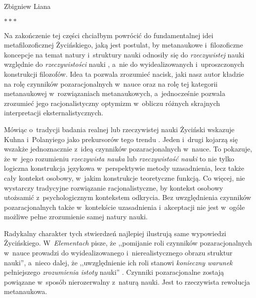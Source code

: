 \begin{artplenv}{Zbigniew Liana}
\pagebreak %
\medskip
{\centering$\ast\ast\ast$\par}
\smallskip


Na zakończenie tej części chciałbym powrócić do fundamentalnej idei metafilozoficznej Życińskiego, jaką jest postulat,
by metanaukowe i~filozoficzne koncepcje na temat natury i~struktury nauki odnosiły się do \textit{rzeczywistej} nauki
względnie do \textit{rzeczywistości} nauki
\parencite*[s.~16 i~126]{zycinski_elementy_1996},
a~nie do wyidealizowanych i~uproszczonych
konstrukcji filozofów. Idea ta pozwala zrozumieć nacisk, jaki nasz autor kładzie na rolę czynników pozaracjonalnych w~nauce
oraz na rolę tej kategorii metanaukowej w~rozwiązaniach metanaukowych, a~jednocześnie pozwala zrozumieć jego
racjonalistyczny optymizm w~obliczu różnych skrajnych interpretacji eksternalistycznych.

Mówiąc o~tradycji badania realnej lub rzeczywistej nauki Życiński wskazuje Kuhna i~Polanyiego jako prekursorów tego
trendu
\parencites[s.~153.169]{zycinski_jezyk_1983}[s.~231]{zycinski_elementy_1996}.
Jeden i~drugi kojarzą się wszakże
jednoznacznie z~ideą czynników pozaracjonalnych w~nauce. To pokazuje, że w~jego rozumieniu \textit{rzeczywista nauka} lub
\textit{rzeczywistość nauki} to nie tylko logiczna konstrukcja językowa w~perspektywie metody uzasadnienia, lecz także
cały kontekst osobowy, w~jakim konstrukcje teoretyczne funkcją. Co więcej, nie wystarczy tradycyjne rozwiązanie
racjonalistyczne, by kontekst osobowy utożsamić z~psychologicznym kontekstem odkrycia. Bez uwzględnienia czynników
pozaracjonalnych także w~kontekście uzasadnienia i~akceptacji nie jest w~ogóle możliwe pełne zrozumienie samej natury
nauki.

Radykalny charakter tych stwierdzeń najlepiej ilustrują same wypowiedzi Życińskiego. W~\textit{Elementach} pisze, że
,,pomijanie roli czynników pozaracjonalnych w~nauce prowadzi do wyidealizowanego i~nierealistycznego obrazu struktur
nauki'',
a~nieco dalej, że ,,uwzględnienie ich roli stanowi
\textit{konieczny warunek} pełniejszego \textit{zrozumienia istoty} nauki''
\parencite[s.~189.190, podkreślenia moje]{zycinski_elementy_1996}.
 Czynniki pozaracjonalne zostają powiązane w~sposób nierozerwalny z~naturą nauki. Jest to
rzeczywista rewolucja metanaukowa.


\end{artplenv}

